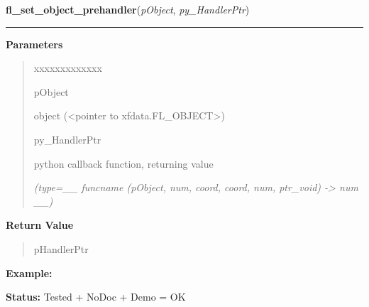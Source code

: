 \hspace{.8\funcindent}\begin{boxedminipage}{\funcwidth}

    \raggedright \textbf{fl\_set\_object\_prehandler}(\textit{pObject}, \textit{py\_HandlerPtr})

    \vspace{-1.5ex}

    \rule{\textwidth}{0.5\fboxrule}
\setlength{\parskip}{2ex}
\setlength{\parskip}{1ex}
      \textbf{Parameters}
      \vspace{-1ex}

      \begin{quote}
        \begin{Ventry}{xxxxxxxxxxxxx}

          \item[pObject]

          object ({\textless}pointer to xfdata.FL\_OBJECT{\textgreater})

          \item[py\_HandlerPtr]

          python callback function, returning value

            {\it (type=\_\_ funcname (pObject, num, coord, coord, num, ptr\_void) -{\textgreater} 
num \_\_)}

        \end{Ventry}

      \end{quote}

      \textbf{Return Value}
    \vspace{-1ex}

      \begin{quote}
      pHandlerPtr

      \end{quote}

\textbf{Example:} 

\textbf{Status:} Tested + NoDoc + Demo = OK



    \end{boxedminipage}

    \label{xformslib:library:fl_set_object_posthandler}

    \vspace{0.5ex}

